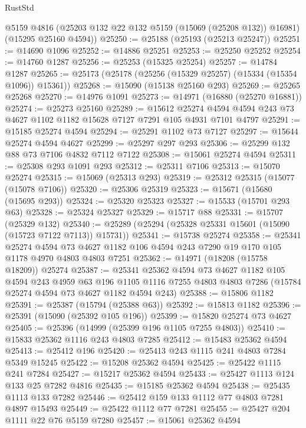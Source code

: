 \begin{lexlean}{RustStd}
\begin{coremodule}
      @5159
      @4816
      (@25203 @132 @22 @132 @5159 (@15069 (@25208 @132)) @16981)
      (@15295 @25160 @4594))
@25250 := @25188 (@25193 (@25213 @25247))
@25251 := @14690 @1096
@25252 := @14886 @25251
@25253 := @25250 @25252
@25254 := @14760 @1287
@25256 := @25253 (@15325 @25254)
@25257 := @14784 @1287
@25265 := @25173 (@25178 (@25256 (@15329 @25257) (@15334 (@15354 @1096)) @15361))
@25268 := @15090 (@15138 @25160 @293)
@25269 := @25265 @25268
@25270 := @14976 @1091
@25273 := @14971 (@16880 (@25270 @16881))
@25274 := @25273 @25160
@25289 := @15612
    @25274
    @4594
    @4594
    @243
    @73
    @4627
    @1102
    @1182
    @15628
    @7127
    @7291
    @105
    @4931
    @7101
    @4797
@25291 := @15185 @25274 @4594
@25294 := @25291 @1102 @73 @7127
@25297 := @15644 @25274 @4594 @4627
@25299 := @25297 @297 @293
@25306 := @25299 @132 @88 @73 @7106 @4832 @7112 @7122
@25308 := @15061 @25274 @4594
@25311 := @25308 @293 @1091 @293
@25312 := @25311 @7106
@25313 := @15070 @25274
@25315 := @15069 (@25313 @293)
@25319 := @25312 @25315 (@15077 (@15078 @7106))
@25320 := @25306 @25319
@25323 := @15671 (@15680 (@15695 @293))
@25324 := @25320 @25323
@25327 := @15533 (@15701 @293 @63)
@25328 := @25324 @25327
@25329 := @15717 @88
@25331 := @15707 (@25329 @132)
@25340 := @25289 (@25294 (@25328 @25331 @15601 (@15090 (@15723 @7122 @7113)) @15731))
@25341 := @15738 @25274
@25358 := @25341
    @25274
    @4594
    @73
    @4627
    @1182
    @106
    @4594
    @243
    @7290
    @19
    @170
    @105
    @1178
    @4970
    @4803
    @4803
    @7251
@25362 := @14971 (@18208 (@15758 @18209)) @25274
@25387 := @25341
    @25362
    @4594
    @73
    @4627
    @1182
    @105
    @4594
    @243
    @4959
    @63
    @196
    @1105
    @1116
    @7255
    @4803
    @4803
    @7286
    (@15784 @25274 @4594 @73 @4627 @1182 @4594 @243)
@25388 := @15806 @1182
@25391 := @25387 (@15794 (@25388 @63))
@25392 := @15813 @1182
@25396 := @25391 (@15090 (@25392 @105 @196))
@25399 := @15820 @25274 @73 @4627
@25405 := @25396 (@14999 (@25399 @196 @1105 @7255 @4803))
@25410 := @15833 @25362 @1116 @243 @4803 @7285
@25412 := @15483 @25362 @4594
@25413 := @25412 @196
@25420 := @25413 @243 @1115 @241 @4803 @7284 @5349 @15245
@25422 := @15208 @25362 @4594
@25425 := @25422 @1115 @241 @7284
@25427 := @15217 @25362 @4594
@25433 := @25427 @1113 @124 @133 @25 @7282 @4816
@25435 := @15185 @25362 @4594
@25438 := @25435 @1113 @133 @7282
@25446 := @25412 @159 @133 @1112 @77 @4803 @7281 @4897 @15493
@25449 := @25422 @1112 @77 @7281
@25455 := @25427 @204 @1111 @22 @76 @5159 @7280
@25457 := @15061 @25362 @4594

\end{coremodule}
\end{lexlean}
